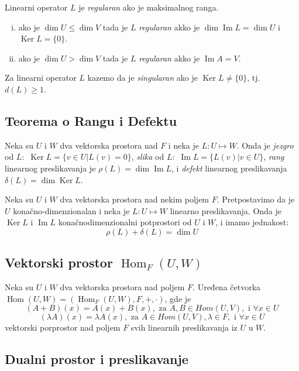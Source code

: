 \documentclass[12p,a4paper]{article}
\DeclareMathOperator{\Ker}{Ker}
\DeclareMathOperator{\Ima}{Im}
\DeclareMathOperator{\Hom}{Hom}
\begin{document}
\begin{multicols}{2}
    Linearni operator $L$ je \textit{regularan} ako je maksimalnog ranga.
    \begin{enumerate}[(i)]
        \itemsep0em
        \item ako je $\dim U \leq \dim V$ tada je $L$ \textit{regularan} 
            akko je $\dim \Ima L = \dim U$ i $\Ker L = \{0\}$.
        \item ako je $\dim U > \dim V$ tada je $L$ \textit{regularan} 
            akko je $\Ima A = V$.
    \end{enumerate}
    Za linearni operator $L$ kazemo da je \textit{singularan} ako je 
    $\Ker L \neq \{0\}$, tj.\ $d(L) \geq 1$.


\subsection{Teorema o Rangu i Defektu}

    Neka su $U$ i $W$ dva vektorska prostora nad $F$ i neka je 
    $L : U \mapsto W$. Onda je \textit{jezgro} od $L$:\ 
    $\Ker L= \{v \in U | L(v) = 0 \}$, \textit{slika} od $L$:\ 
    $\Ima L = \{ L(v) | v \in U\}$, \textit{rang} linearnog preslikavanja je 
    $\rho (L) = \dim \Ima L$, i \textit{defekt} linearnog preslikavanja 
    $\delta(L) = \dim \Ker L$.

    Neka su $U$ i $W$ dva vektorska prostora nad nekim poljem $F$. 
    Pretpostavimo da je $U$ konačno-dimenzionalan i neka je 
    $L : U \mapsto W$ linearno preslikavanja. Onda je $\Ker L$ i $\Ima L$ 
    konačnodimenzionalni potprostori od $U$ i $W$, i imamo jednakost:
    \[\rho (L) + \delta (L) = \dim U \]

\subsection{Vektorski prostor $\Hom_F (U, W)$}

    Neka su $U$ i $W$ dva vektorska prostora nad poljem $F$. Uređena četvorka 
    $\Hom(U, W) = (\Hom_F(U, W), F, +, \cdot)$, gde je
    \[ (A + B) (x) = A(x) + B(x), \text{ za } A, B \in Hom(U, V), 
    \text { i } \forall x \in U\]
    \[ (\lambda A) (x) = \lambda A(x), \text{ za } A \in Hom(U, V), 
    \lambda \in F, \text { i } \forall x \in U\]
    vektorski porprostor nad poljem $F$ svih linearnih preslikavanja 
    iz $U$ u $W$.

\subsection{Dualni prostor i preslikavanje}


\end{multicols}
\end{document}
